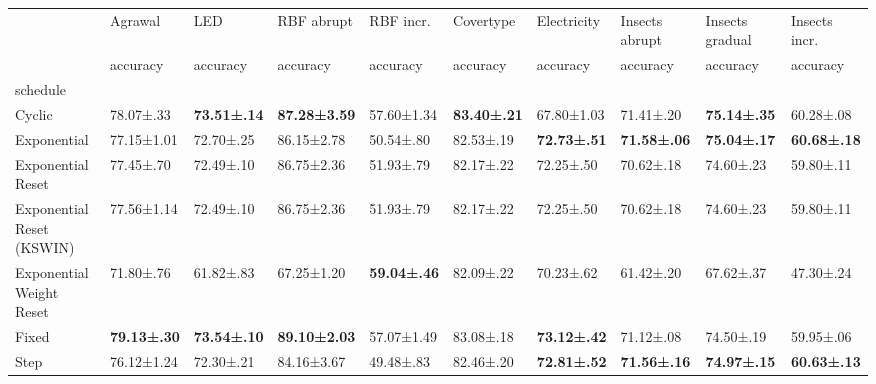 \begin{tabular}{llllllllll}
\toprule
 & Agrawal & LED & RBF abrupt & RBF incr. & Covertype & Electricity & Insects abrupt & Insects gradual & Insects incr. \\
 & accuracy & accuracy & accuracy & accuracy & accuracy & accuracy & accuracy & accuracy & accuracy \\
schedule &  &  &  &  &  &  &  &  &  \\
\midrule
Cyclic & 78.07±.33 & \bfseries 73.51±.14 & \bfseries 87.28±3.59 & 57.60±1.34 & \bfseries 83.40±.21 & 67.80±1.03 & 71.41±.20 & \bfseries 75.14±.35 & 60.28±.08 \\
Exponential & 77.15±1.01 & 72.70±.25 & 86.15±2.78 & 50.54±.80 & 82.53±.19 & \bfseries 72.73±.51 & \bfseries 71.58±.06 & \bfseries 75.04±.17 & \bfseries 60.68±.18 \\
Exponential Reset & 77.45±.70 & 72.49±.10 & 86.75±2.36 & 51.93±.79 & 82.17±.22 & 72.25±.50 & 70.62±.18 & 74.60±.23 & 59.80±.11 \\
Exponential Reset (KSWIN) & 77.56±1.14 & 72.49±.10 & 86.75±2.36 & 51.93±.79 & 82.17±.22 & 72.25±.50 & 70.62±.18 & 74.60±.23 & 59.80±.11 \\
Exponential Weight Reset & 71.80±.76 & 61.82±.83 & 67.25±1.20 & \bfseries 59.04±.46 & 82.09±.22 & 70.23±.62 & 61.42±.20 & 67.62±.37 & 47.30±.24 \\
Fixed & \bfseries 79.13±.30 & \bfseries 73.54±.10 & \bfseries 89.10±2.03 & 57.07±1.49 & 83.08±.18 & \bfseries 73.12±.42 & 71.12±.08 & 74.50±.19 & 59.95±.06 \\
Step & 76.12±1.24 & 72.30±.21 & 84.16±3.67 & 49.48±.83 & 82.46±.20 & \bfseries 72.81±.52 & \bfseries 71.56±.16 & \bfseries 74.97±.15 & \bfseries 60.63±.13 \\
\bottomrule
\end{tabular}
